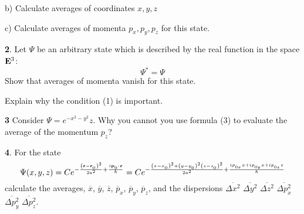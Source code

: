 b) Calculate averages of coordinates $x,y,z$

c) Calculate averages of momenta $p_x,p_y,p_z$ for this state. 

\m

{\bf 2}.
Let  $\Psi$ be an arbitrary state which is described by the real
function in the space ${\bf E}^3$:  
        $$
 \Psi^*=\Psi
        $$
Show that averages of momenta vanish for this state.

Explain why the condition (1) is important.

\m


{\bf 3}  Consider 
       $\Psi=e^{-x^2-y^2}z$.
Why you cannot  you use formula (3) to evaluate  the average of the 
momentum $p_z$?

\m


{\bf 4}.
For the state
        $$
\Psi(x,y,z)=C e^{-
           {
        \left(
    {\bf r}-{\bf r}_{_0}
       \right)^2
           \over
            2a^2}
         +{i{\bf p}_{_0}\cdot {\bf r}\over \hbar}}
= C e^{-
           {
        \left(
    x-x_{_0}
       \right)^2
              +
        \left(
    y-y_{_0}
       \right)^2
        \left(
    z-z_{_0}
       \right)^2
           \over
            2a^2}
         +{
         ip_{_{0x}}x+
         ip_{_{0y}}x+
         ip_{_{0z}}z
          \over \hbar}}
        $$
calculate
the averages,  
$\overline x$,
$\overline y$, 
$ \overline z$,
$ \overline p_x$,
$ \overline p_y$,
$ \overline p_z$,
and the dispersions 
$\overline {\Delta x^2}$
$\overline {\Delta y^2}$
$\overline {\Delta z^2}$
$\overline {\Delta p_x^2}$
$\overline {\Delta p_y^2}$
$\overline {\Delta p_z^2}$.

\bye
